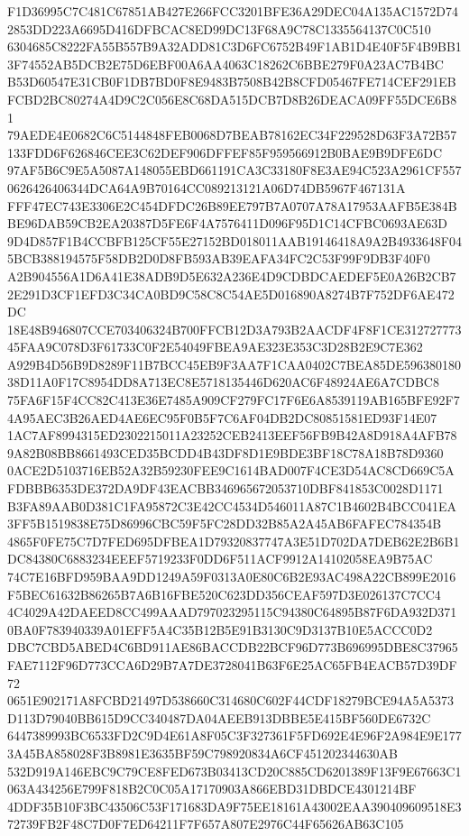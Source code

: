 \documentclass[UTF8,fontset=fandol,zihao=-4,a4paper]{ctexart}
\begin{document}
{{F1D36995C7C481C67851AB427E266FCC3201BFE36A29DEC04A135AC1572D742853DD223A6695D416DFBCAC8ED99DC13F68A9C78C1335564137C0C510
6304685C8222FA55B557B9A32ADD81C3D6FC6752B49F1AB1D4E40F5F4B9BB13F74552AB5DCB2E75D6EBF00A6AA4063C18262C6BBE279F0A23AC7B4BC
B53D60547E31CB0F1DB7BD0F8E9483B7508B42B8CFD05467FE714CEF291EBFCBD2BC80274A4D9C2C056E8C68DA515DCB7D8B26DEACA09FF55DCE6B81
79AEDE4E0682C6C5144848FEB0068D7BEAB78162EC34F229528D63F3A72B57133FDD6F626846CEE3C62DEF906DFFEF85F959566912B0BAE9B9DFE6DC
97AF5B6C9E5A5087A148055EBD661191CA3C33180F8E3AE94C523A2961CF5570626426406344DCA64A9B70164CC089213121A06D74DB5967F467131A
FFF47EC743E3306E2C454DFDC26B89EE797B7A0707A78A17953AAFB5E384BBE96DAB59CB2EA20387D5FE6F4A7576411D096F95D1C14CFBC0693AE63D
9D4D857F1B4CCBFB125CF55E27152BD018011AAB19146418A9A2B4933648F045BCB388194575F58DB2D0D8FB593AB39EAFA34FC2C53F99F9DB3F40F0
A2B904556A1D6A41E38ADB9D5E632A236E4D9CDBDCAEDEF5E0A26B2CB72E291D3CF1EFD3C34CA0BD9C58C8C54AE5D016890A8274B7F752DF6AE472DC
18E48B946807CCE703406324B700FFCB12D3A793B2AACDF4F8F1CE31272777345FAA9C078D3F61733C0F2E54049FBEA9AE323E353C3D28B2E9C7E362
A929B4D56B9D8289F11B7BCC45EB9F3AA7F1CAA0402C7BEA85DE59638018038D11A0F17C8954DD8A713EC8E5718135446D620AC6F48924AE6A7CDBC8
75FA6F15F4CC82C413E36E7485A909CF279FC17F6E6A8539119AB165BFE92F74A95AEC3B26AED4AE6EC95F0B5F7C6AF04DB2DC80851581ED93F14E07
1AC7AF8994315ED2302215011A23252CEB2413EEF56FB9B42A8D918A4AFB789A82B08BB8661493CED35BCDD4B43DF8D1E9BDE3BF18C78A18B78D9360
0ACE2D5103716EB52A32B59230FEE9C1614BAD007F4CE3D54AC8CD669C5AFDBBB6353DE372DA9DF43EACBB346965672053710DBF841853C0028D1171
B3FA89AAB0D381C1FA95872C3E42CC4534D546011A87C1B4602B4BCC041EA3FF5B1519838E75D86996CBC59F5FC28DD32B85A2A45AB6FAFEC784354B
4865F0FE75C7D7FED695DFBEA1D79320837747A3E51D702DA7DEB62E2B6B1DC84380C6883234EEEF5719233F0DD6F511ACF9912A14102058EA9B75AC
74C7E16BFD959BAA9DD1249A59F0313A0E80C6B2E93AC498A22CB899E2016F5BEC61632B86265B7A6B16FBE520C623DD356CEAF597D3E026137C7CC4
4C4029A42DAEED8CC499AAAD797023295115C94380C64895B87F6DA932D3710BA0F783940339A01EFF5A4C35B12B5E91B3130C9D3137B10E5ACCC0D2
DBC7CBD5ABED4C6BD911AE86BACCDB22BCF96D773B696995DBE8C37965FAE7112F96D773CCA6D29B7A7DE3728041B63F6E25AC65FB4EACB57D39DF72
0651E902171A8FCBD21497D538660C314680C602F44CDF18279BCE94A5A5373D113D79040BB615D9CC340487DA04AEEB913DBBE5E415BF560DE6732C
6447389993BC6533FD2C9D4E61A8F05C3F327361F5FD692E4E96F2A984E9E1773A45BA858028F3B8981E3635BF59C798920834A6CF451202344630AB
532D919A146EBC9C79CE8FED673B03413CD20C885CD6201389F13F9E67663C1063A434256E799F818B2C0C05A17170903A866EBD31DBDCE4301214BF
4DDF35B10F3BC43506C53F171683DA9F75EE18161A43002EAA390409609518E372739FB2F48C7D0F7ED64211F7F657A807E2976C44F65626AB63C105
}}
\end{document}
